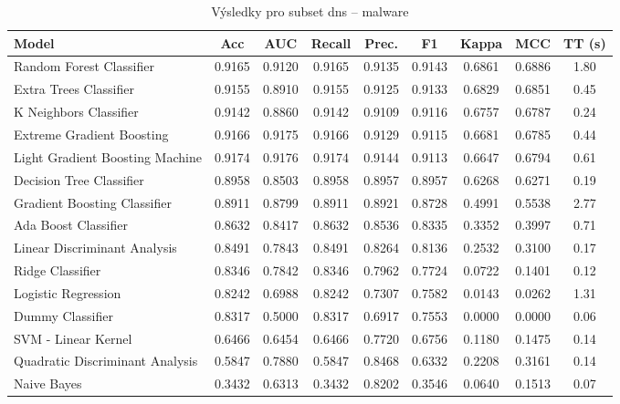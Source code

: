 \begin{table}[H]
  \centering
  \small
  \caption{Výsledky pro subset dns – malware}
  \begin{tabular}{|l|c|c|c|c|c|c|c|c|}
    \hline
    \textbf{Model} & \textbf{Acc} & \textbf{AUC} & \textbf{Recall} & \textbf{Prec.} & \textbf{F1} & \textbf{Kappa} & \textbf{MCC} & \textbf{TT (s)} \\
    \hline
    Random Forest Classifier & 0.9165 & 0.9120 & 0.9165 & 0.9135 & 0.9143 & 0.6861 & 0.6886 & 1.80 \\
    Extra Trees Classifier & 0.9155 & 0.8910 & 0.9155 & 0.9125 & 0.9133 & 0.6829 & 0.6851 & 0.45 \\
    K Neighbors Classifier & 0.9142 & 0.8860 & 0.9142 & 0.9109 & 0.9116 & 0.6757 & 0.6787 & 0.24 \\
    Extreme Gradient Boosting & 0.9166 & 0.9175 & 0.9166 & 0.9129 & 0.9115 & 0.6681 & 0.6785 & 0.44 \\
    Light Gradient Boosting Machine & 0.9174 & 0.9176 & 0.9174 & 0.9144 & 0.9113 & 0.6647 & 0.6794 & 0.61 \\
    Decision Tree Classifier & 0.8958 & 0.8503 & 0.8958 & 0.8957 & 0.8957 & 0.6268 & 0.6271 & 0.19 \\
    Gradient Boosting Classifier & 0.8911 & 0.8799 & 0.8911 & 0.8921 & 0.8728 & 0.4991 & 0.5538 & 2.77 \\
    Ada Boost Classifier & 0.8632 & 0.8417 & 0.8632 & 0.8536 & 0.8335 & 0.3352 & 0.3997 & 0.71 \\
    Linear Discriminant Analysis & 0.8491 & 0.7843 & 0.8491 & 0.8264 & 0.8136 & 0.2532 & 0.3100 & 0.17 \\
    Ridge Classifier & 0.8346 & 0.7842 & 0.8346 & 0.7962 & 0.7724 & 0.0722 & 0.1401 & 0.12 \\
    Logistic Regression & 0.8242 & 0.6988 & 0.8242 & 0.7307 & 0.7582 & 0.0143 & 0.0262 & 1.31 \\
    Dummy Classifier & 0.8317 & 0.5000 & 0.8317 & 0.6917 & 0.7553 & 0.0000 & 0.0000 & 0.06 \\
    SVM - Linear Kernel & 0.6466 & 0.6454 & 0.6466 & 0.7720 & 0.6756 & 0.1180 & 0.1475 & 0.14 \\
    Quadratic Discriminant Analysis & 0.5847 & 0.7880 & 0.5847 & 0.8468 & 0.6332 & 0.2208 & 0.3161 & 0.14 \\
    Naive Bayes & 0.3432 & 0.6313 & 0.3432 & 0.8202 & 0.3546 & 0.0640 & 0.1513 & 0.07 \\
    \hline
  \end{tabular}
\end{table}
\vspace{0.5cm}


